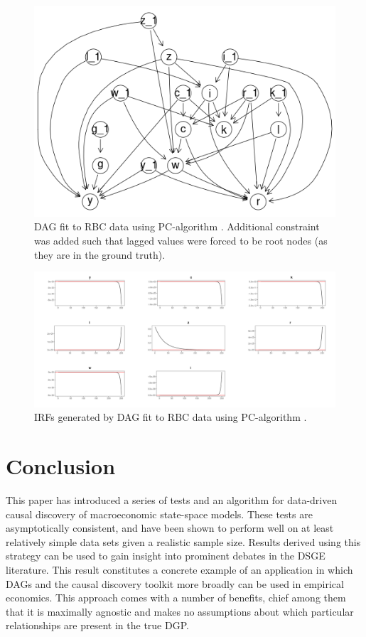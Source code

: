 \documentclass{article}
\begin{document}
\begin{figure}
  \centering
  \includegraphics[width=0.8\linewidth]{images/rbc_constraint_dag.png}
  \caption{DAG fit to RBC data using PC-algorithm \parencite{kalisch2007estimating}. Additional constraint was added such that lagged values were forced to be root nodes (as they are in the ground truth).}
  \label{pcdag}
\end{figure}

\begin{figure}
  \centering
  \includegraphics[width=0.8\linewidth]{images/rbc_constraint_irf.png}
  \caption{IRFs generated by DAG fit to RBC data using PC-algorithm \parencite{kalisch2007estimating}.}
  \label{pcirf}
\end{figure}

\section{Conclusion} \label{conclusion}

This paper has introduced a series of tests and an algorithm for data-driven causal discovery of macroeconomic state-space models. These tests are asymptotically consistent, and have been shown to perform well on at least relatively simple data sets given a realistic sample size. Results derived using this strategy can be used to gain insight into prominent debates in the DSGE literature. This result constitutes a concrete example of an application in which DAGs and the causal discovery toolkit more broadly can be used in empirical economics. This approach comes with a number of benefits, chief among them that it is maximally agnostic and makes no assumptions about which particular relationships are present in the true DGP.
\end{document}
